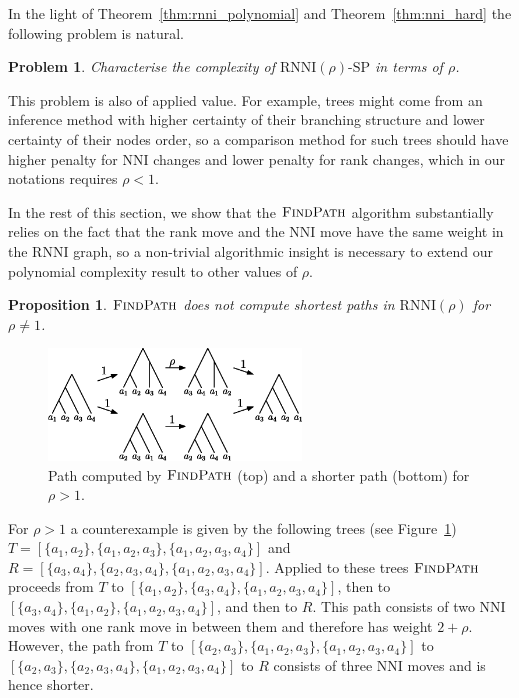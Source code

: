 \documentclass[11pt]{amsart}
\newtheorem{proposition}{Proposition}
\newtheorem{problem}{Problem}
\newcommand{\rnni}{\mathrm{RNNI}}
\newcommand{\findpath}{\textsc{FindPath}}
\newcommand{\nni}{\mathrm{NNI}}
\newcommand{\decprob}[1]{\rnni(#1)\text{-}\mathrm{SP}}
\begin{document}
In the light of Theorem~\ref{thm:rnni_polynomial} and Theorem~\ref{thm:nni_hard} the following problem is natural.

\begin{problem}
Characterise the complexity of $\decprob{\rho}$ in terms of $\rho$.
\label{prblm:rho_range}
\end{problem}

This problem is also of applied value.
For example, trees might come from an inference method with higher certainty of their branching structure and lower certainty of their nodes order, so a comparison method for such trees should have higher penalty for $\nni$ changes and lower penalty for rank changes, which in our notations requires $\rho < 1$.

In the rest of this section, we show that the $\findpath$ algorithm substantially relies on the fact that the rank move and the $\nni$ move have the same weight in the $\rnni$ graph, so a non-trivial algorithmic insight is necessary to extend our polynomial complexity result to other values of $\rho$.

\begin{proposition}
$\findpath$ does not compute shortest paths in $\rnni(\rho)$ for $\rho \neq 1$.
\label{prop:fp_only_rnni}
\end{proposition}

\proof

\begin{figure}[ht]
\centering
\includegraphics[width=0.6\textwidth]{fp_rho_greater_1_counterexample}
\caption{Path computed by $\findpath$ (top) and a shorter path (bottom) for $\rho > 1$.}
\label{fig:fp_rho_greater_1_counterexample}
\end{figure}

For $\rho > 1$ a counterexample is given by the following trees (see Figure~\ref{fig:fp_rho_greater_1_counterexample})\\
$T = [\{a_1,a_2\},\{a_1,a_2,a_3\},\{a_1,a_2,a_3,a_4\}]$ and\\
$R = [\{a_3,a_4\},\{a_2,a_3,a_4\},\{a_1,a_2,a_3,a_4\}]$.
Applied to these trees $\findpath$ proceeds from $T$ to $[\{a_1,a_2\},\{a_3,a_4\},\{a_1,a_2,a_3,a_4\}]$, then to $[\{a_3,a_4\},\{a_1,a_2\},\{a_1,a_2,a_3,a_4\}]$, and then to $R$.
This path consists of two $\nni$ moves with one rank move in between them and therefore has weight $2 + \rho$.
However, the path from $T$ to $[\{a_2,a_3\},\{a_1,a_2,a_3\},\{a_1,a_2,a_3,a_4\}]$ to $[\{a_2,a_3\},\{a_2,a_3,a_4\},\{a_1,a_2,a_3,a_4\}]$ to $R$ consists of three $\nni$ moves and is hence shorter.
\end{document}

